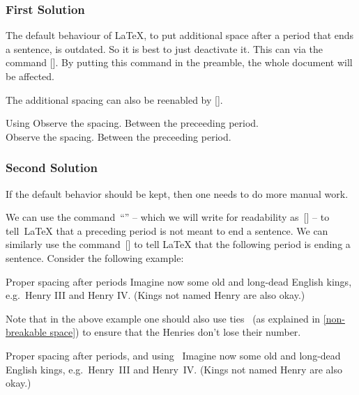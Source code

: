 \subsubsection{First Solution}

The default behaviour of {\LaTeX}, to put additional space after a period that ends a sentence, is outdated.
So it is best to just deactivate it.
This can via the command [\comname].
By putting this command in the preamble, the whole document will be affected.


The additional spacing can also be reenabled by [\comname].

\begin{showlatex}{Using }
  \frenchspacing
  Observe the spacing. Between the preceeding period.
  \nonfrenchspacing\\
  Observe the spacing. Between the preceeding period.
\end{showlatex}

\subsubsection{Second Solution}

If the default behavior should be kept, then one needs to do more manual work.

We can use the command~\enquote{\comname{ }} -- which we will write for readability as~[\comname] -- to tell~{\LaTeX} that a preceding period is not meant to end a sentence.
We can similarly use the command~[\comname] to tell {\LaTeX} that the following period is ending a sentence.
Consider the following example:
\begin{showlatex}{Proper spacing after periods}
Imagine now some old and long-dead English kings, e.g.\ Henry III and Henry IV\@.
(Kings not named Henry are also okay.)
\end{showlatex}
Note that in the above example one should also use ties~\inlinecode{\customtexttilde} (as explained in \cref{non-breakable space}) to ensure that the Henries don’t lose their number.
\begin{showlatex}{Proper spacing after periods, and using~\inlinecode{\customtexttilde}}
Imagine now some old and long-dead English kings, e.g.\ Henry~III and Henry~IV\@.
(Kings not named Henry are also okay.)
\end{showlatex}


